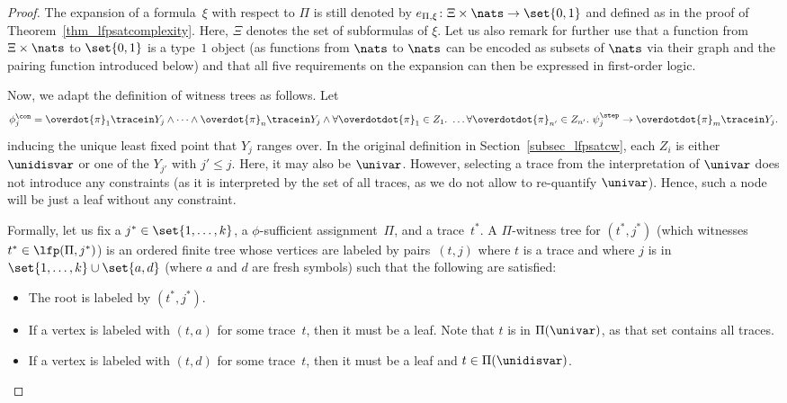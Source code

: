 \begin{proof}
The expansion of a formula~$\xi$ with respect to $\Pi$ is  still denoted by $e_{\Pi,\xi}\colon \Xi\times\nats \rightarrow \set{0,1}$ and defined as in the proof of Theorem~\ref{thm_lfpsatcomplexity}.
Here, $\Xi$ denotes the set of subformulas of $\xi$.
Let us also remark for further use that a function from $\Xi\times\nats $ to $\set{0,1}$ is a type~$1$ object (as functions from $\nats$ to $\nats$ can be encoded as subsets of $\nats$ via their graph and the pairing function introduced below) and that all five requirements on the expansion can then be expressed in first-order logic.

Now, we adapt the definition of witness trees as follows.
Let
\begin{equation}
\label{eq_phiconscnd}
\phi_j^\con = \overdot{\pi}_1\tracein Y_j \wedge \cdots \wedge \overdot{\pi}_n \tracein Y_j \wedge   \forall \overdotdot{\pi}_1 \in Z_1.\ \ldots \forall \overdotdot{\pi}_{n'} \in Z_{n'}.\ \psi^\step_j \rightarrow \overdotdot{\pi}_m \tracein Y_j.    
\end{equation}
inducing the unique least fixed point that $Y_j$ ranges over. 
In the original definition in Section~\ref{subsec_lfpsatcw}, each $Z_i$ is either $\unidisvar$ or one of the $Y_{j'}$ with $j' \le j$.
Here, it may also be $\univar$.
However, selecting a trace from the interpretation of $\univar$ does not introduce any constraints (as it is interpreted by the set of all traces, as we do not allow to re-quantify $\univar$).
Hence, such a node will be just a leaf without any constraint. 

Formally, let us fix a $j^* \in \set{1,\ldots,k}$, a $\phi$-sufficient assignment~$\Pi$, and a trace~$t^*$. 
A $\Pi$-witness tree for $(t^*,j^*)$ (which witnesses~$t^* \in\lfp(\Pi,j^*)$) is an ordered finite tree whose vertices are labeled by pairs~$(t,j)$ where $t$ is a trace and where $j $ is in $\set{1,\ldots, k} \cup \set{a,d}$ (where $a$ and $d$ are fresh symbols) such that the following are satisfied:
\begin{itemize}
    \item The root is labeled by $(t^*, j^*)$.
    
    \item If a vertex is labeled with $(t,a)$ for some trace~$t$, then it must be a leaf. Note that $t$ is in $\Pi(\univar)$, as that set contains all traces.
    
    \item If a vertex is labeled with $(t,d)$ for some trace~$t$, then it must be a leaf and $t \in \Pi(\unidisvar)$.
    

\end{itemize}
\end{proof}
